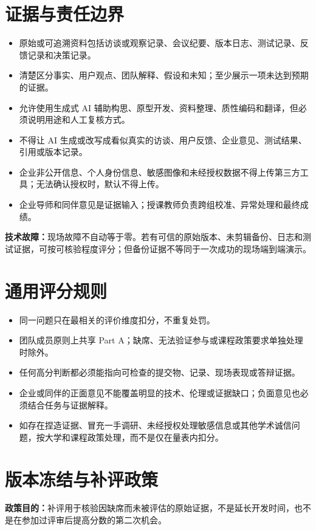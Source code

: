 \documentclass[11pt]{article}
\begin{document}
\section{证据与责任边界}
\begin{itemize}
  \item 原始或可追溯资料包括访谈或观察记录、会议纪要、版本日志、测试记录、反馈记录和决策记录。
  \item 清楚区分事实、用户观点、团队解释、假设和未知；至少展示一项未达到预期的证据。
  \item 允许使用生成式 AI 辅助构思、原型开发、资料整理、质性编码和翻译，但必须说明用途和人工复核方式。
  \item 不得让 AI 生成或改写成看似真实的访谈、用户反馈、企业意见、测试结果、引用或版本记录。
  \item 企业非公开信息、个人身份信息、敏感图像和未经授权数据不得上传第三方工具；无法确认授权时，默认不得上传。
  \item 企业导师和同伴意见是证据输入；授课教师负责跨组校准、异常处理和最终成绩。
\end{itemize}

\noindent\textbf{技术故障：}现场故障不自动等于零。若有可信的原始版本、未剪辑备份、日志和测试证据，可按可核验程度评分；但备份证据不等同于一次成功的现场端到端演示。

\section{通用评分规则}
\begin{itemize}
  \item 同一问题只在最相关的评价维度扣分，不重复处罚。
  \item 团队成员原则上共享 Part A；缺席、无法验证参与或课程政策要求单独处理时除外。
  \item 任何高分判断都必须能指向可检查的提交物、记录、现场表现或答辩证据。
  \item 企业或同伴的正面意见不能覆盖明显的技术、伦理或证据缺口；负面意见也必须结合任务与证据解释。
  \item 如存在捏造证据、冒充一手调研、未经授权处理敏感信息或其他学术诚信问题，按大学和课程政策处理，而不是仅在量表内扣分。
\end{itemize}

\section{版本冻结与补评政策}
\noindent\textbf{政策目的：}补评用于核验因缺席而未被评估的原始证据，不是延长开发时间，也不是在参加过评审后提高分数的第二次机会。
\end{document}
